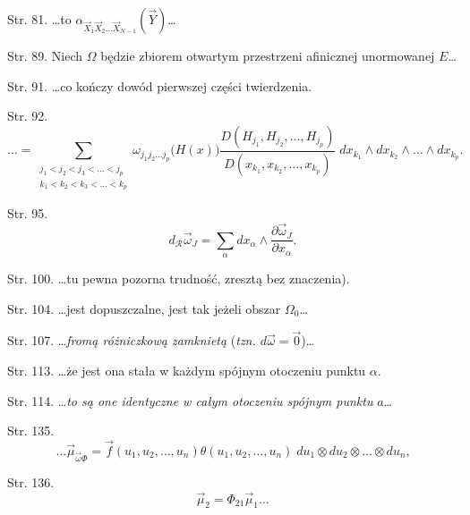 \documentclass[a4paper,11pt]{article}
\numberwithin{equation}{section}
\begin{document}
Str. 81. \ldots to
$\alpha_{ \vec{ X }_{ 1 } \vec{ X }_{ 2 } \ldots \vec{ X }_{ N - 1 } }
( \vec{ Y } )$\ldots

Str. 89. Niech $\Omega$ będzie zbiorem
otwartym przestrzeni af\mbox{}inicznej unormowanej $E$\ldots

Str. 91. \ldots co kończy dowód pierwszej części twierdzenia.

Str. 92. $$\ldots = \sum_{ \substack{ j_{ 1 } < j_{ 2 } < j_{ 3 } < \ldots < j_{ p } \\
    k_{ 1 } < k_{ 2 } < k_{ 3 } < \ldots < k_{ p } } } \omega_{ j_{ 1
  } j_{ 2 } \ldots j_{ p } } \big( H( x ) \big) \frac{ D( H_{ j_{ 1 }
  }, H_{ j_{ 2 } }, \ldots, H_{ j_{ p } } ) }{ D( x_{ k_{ 1 } }, x_{
    k_{ 2 } }, \ldots, x_{ k_{ p } } ) } \; dx_{ k_{ 1 } } \wedge dx_{
  k_{ 2 } } \wedge \ldots \wedge dx_{ k_{ p } } \textrm{.}$$

Str. 95.
$$d_{ \mathcal{ R } } \vec{ \omega }_{ J } = \sum_{ \alpha } dx_{
  \alpha} \wedge \frac{ \partial \vec{ \omega }_{ J } }{ \partial x_{
    \alpha } } \textrm{.}$$

Str. 100. \ldots tu pewna pozorna trudność, zresztą bez
znaczenia).

Str. 104. \ldots jest dopuszczalne, jest tak jeżeli obszar
$\Omega_{ 0 }$\ldots

Str. 107. \ldots\textit{fromą różniczkową zamknietą} (\textit{tzn.
  $d\vec{ \omega } = \vec{ 0 }$})\ldots

Str. 113. \ldots że jest ona stała w każdym spójnym otoczeniu
punktu $\alpha$.

Str. 114. \ldots\textit{to są one identyczne w całym otoczeniu
  spójnym punktu} $a$\ldots

Str. 135.
$$\ldots \vec{ \mu }_{ \vec{ \omega } \Phi } = \vec{ f }( u_{ 1 },
u_{ 2 }, \ldots, u_{ n } ) \theta( u_{ 1 }, u_{ 2 }, \ldots, u_{ n } )
\; du_{ 1 } \otimes du_{ 2 } \otimes \ldots \otimes du_{ n }
\textrm{,}$$

Str. 136.
$$\vec{ \mu }_{ 2 } = \Phi_{ 2 1 } \vec{ \mu }_{ 1 } \ldots$$













\printbibliography





\end{document}
